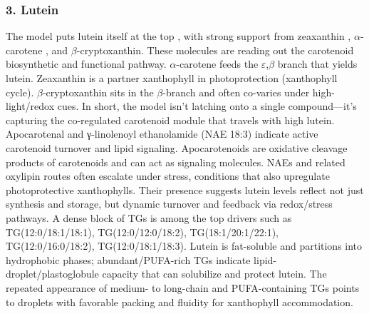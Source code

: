 \documentclass[10pt,letterpaper]{article}
\begin{document}
\begin{itemize}
\subsubsection*{3. Lutein} 
The model puts lutein itself at the top , with strong support from zeaxanthin , $\alpha$-carotene , and $\beta$-cryptoxanthin. These molecules are reading out the carotenoid biosynthetic and functional pathway. $\alpha$-carotene feeds the $\varepsilon$,$\beta$ branch that yields lutein. Zeaxanthin is a partner xanthophyll in photoprotection (xanthophyll cycle). $\beta$-cryptoxanthin sits in the $\beta$-branch and often co-varies under high-light/redox cues. In short, the model isn’t latching onto a single compound—it’s capturing the co-regulated carotenoid module that travels with high lutein.
Apocarotenal and γ-linolenoyl ethanolamide (NAE 18:3) indicate active carotenoid turnover and lipid signaling. Apocarotenoids are oxidative cleavage products of carotenoids and can act as signaling molecules. NAEs and related oxylipin routes often escalate under stress, conditions that also upregulate photoprotective xanthophylls. Their presence suggests lutein levels reflect not just synthesis and storage, but dynamic turnover and feedback via redox/stress pathways.
A dense block of TGs is among the top drivers such as TG(12:0/18:1/18:1), TG(12:0/12:0/18:2), TG(18:1/20:1/22:1), TG(12:0/16:0/18:2), TG(12:0/18:1/18:3). Lutein is fat-soluble and partitions into hydrophobic phases; abundant/PUFA-rich TGs indicate lipid-droplet/plastoglobule capacity that can solubilize and protect lutein. The repeated appearance of medium- to long-chain and PUFA-containing TGs points to droplets with favorable packing and fluidity for xanthophyll accommodation.





\end{itemize}
\end{document}

